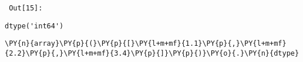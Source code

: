         {\par%
        \vspace{-1\smallerfontscale}%
        \noindent%
        \begin{minipage}{\cellleftmargin}%
    \hfill%
    {\smaller%
    \tt%
    \color{nbframe-out-prompt}%
    Out[15]:}%
    \hspace{\inputpadding}%
    \hspace{0em}%
    \hspace{3pt}%
    \end{minipage}%
        }%
    \begin{addmargin}[\cellleftmargin]{0em}%
    {\smaller%
    \vspace{-1\smallerfontscale}%
    
    
    
    \begin{verbatim}
dtype('int64')
    \end{verbatim}

    
}%
    \end{addmargin}%

{\par%
\vspace{-1\baselineskip}%
}%
\begin{notebookcell}[16]%
\begin{addmargin}[\cellleftmargin]{0em}%
{\smaller%
\par%
%
\vspace{-1\smallerfontscale}%
\begin{Verbatim}[commandchars=\\\{\}]
\PY{n}{array}\PY{p}{(}\PY{p}{[}\PY{l+m+mf}{1.1}\PY{p}{,}\PY{l+m+mf}{2.2}\PY{p}{,}\PY{l+m+mf}{3.4}\PY{p}{]}\PY{p}{)}\PY{o}{.}\PY{n}{dtype}
\end{Verbatim}
%
\par%
\vspace{-1\smallerfontscale}}%
\end{addmargin}
\end{notebookcell}

\par\vspace{1\smallerfontscale}%
    
